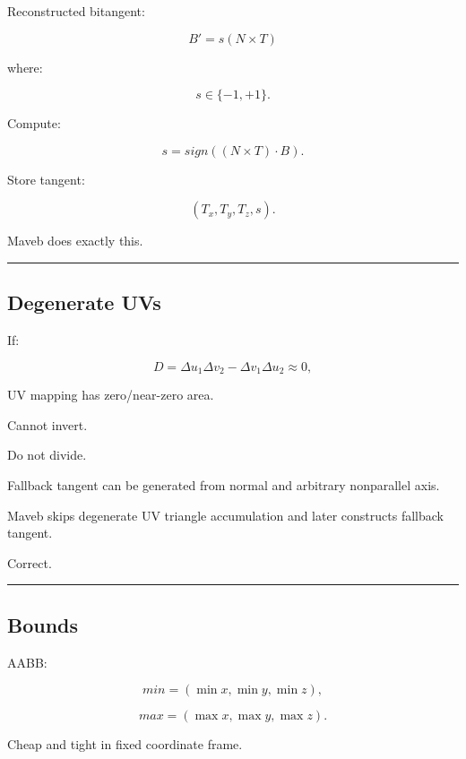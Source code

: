 \hypertarget{04-visual-computing-ii-ch041-handedness}{}

Reconstructed bitangent:

\[
B'
=
s(N\times T)
\]

where:

\[
s\in\{-1,+1\}.
\]

Compute:

\[
\boxed{
s=
sign(
(N\times T)\cdot B
).
}
\]

Store tangent:

\[
(T_x,T_y,T_z,s).
\]

Maveb does exactly this.

\begin{center}\rule{0.5\linewidth}{0.5pt}\end{center}

\subsection{Degenerate UVs}\label{04-visual-computing-ii-ch041-degenerate-uvs}

\hypertarget{04-visual-computing-ii-ch041-degenerate-uvs}{}

If:

\[
D
=
\Delta u_1\Delta v_2-
\Delta v_1\Delta u_2
\approx0,
\]

UV mapping has zero/near-zero area.

Cannot invert.

Do not divide.

Fallback tangent can be generated from normal and arbitrary nonparallel axis.

Maveb skips degenerate UV triangle accumulation and later constructs fallback tangent.

Correct.

\begin{center}\rule{0.5\linewidth}{0.5pt}\end{center}

\subsection{Bounds}\label{04-visual-computing-ii-ch041-bounds}

\hypertarget{04-visual-computing-ii-ch041-bounds}{}

AABB:

\[
min=
(\min x,\min y,\min z),
\]

\[
max=
(\max x,\max y,\max z).
\]

Cheap and tight in fixed coordinate frame.

